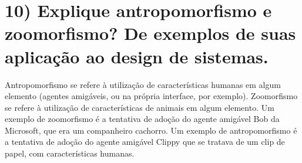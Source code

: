 \section{10) Explique antropomorfismo e zoomorfismo? De exemplos de suas 
aplicação ao design de sistemas.}

Antropomorfismo se refere à utilização de características humanas em algum 
elemento (agentes amigáveis, ou na própria interface, por exemplo).
Zoomorfismo se refere à utilização de características de animais em algum 
elemento. Um exemplo de zoomorfismo é a tentativa de adoção do agente amigável 
Bob da Microsoft, que era um companheiro cachorro.
Um exemplo de antropomorfismo é a tentativa de adoção do agente amigável 
Clippy que se tratava de um clip de papel, com características humanas.
